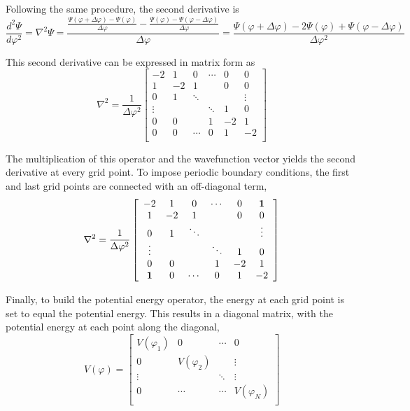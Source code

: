 \documentclass[12pt,a4paper]{article}
\begin{document}
Following the same procedure, the second derivative is
$$
\frac{d^2\Psi}{d\varphi^2} = \nabla^2\Psi = \frac{\frac{\Psi(\varphi+\Delta\varphi)-\Psi(\varphi)}{\Delta\varphi} - \frac{\Psi(\varphi)-\Psi(\varphi-\Delta\varphi)}{\Delta\varphi}}{\Delta\varphi} = \frac{\Psi(\varphi+\Delta\varphi)-2\Psi(\varphi)+\Psi(\varphi-\Delta\varphi)}{\Delta\varphi^2}
$$

This second derivative can be expressed in matrix form as
\[
    \nabla^2 = \frac{1}{\Delta\varphi^2}
    \left[ {\begin{array}{cccccc}
    -2      &  1     &  0     & \cdots &  0    &  0      \\
     1      & -2     &  1     &        &  0    &  0      \\
     0      &  1     & \ddots &        &       &  \vdots \\
     \vdots &        &        & \ddots &  1    &  0      \\
     0      &  0     &        &  1     & -2    &  1      \\
     0      &  0     & \cdots &  0     &  1    & -2      \\
    \end{array} } \right]
\]

The multiplication of this operator and the wavefunction vector yields the second derivative at every grid point.
To impose periodic boundary conditions, the first and last grid points are connected with an off-diagonal term,
\[
    \nabla^2 = \frac{1}{\Delta\varphi^2}
    \left[ {\begin{array}{cccccc}
    -2      &  1     &  0     & \cdots &  0    &  \bf{1} \\
     1      & -2     &  1     &        &  0    &  0      \\
     0      &  1     & \ddots &        &       &  \vdots \\
     \vdots &        &        & \ddots &  1    &  0      \\
     0      &  0     &        &  1     & -2    &  1      \\
     \bf{1} &  0     & \cdots &  0     &  1    & -2      \\
    \end{array} } \right]
\]

Finally, to build the potential energy operator, the energy at each grid point is set to equal the potential energy.
This results in a diagonal matrix, with the potential energy at each point along the diagonal,
\[
    V(\varphi) =
    \left[ {\begin{array}{cccc}
    V(\varphi_1) &  0            &  \cdots &  0          \\
     0           &  V(\varphi_2) &         &  \vdots     \\
     \vdots      &               &  \ddots &   \vdots     \\
     0           &   \cdots      &  \cdots & V(\varphi_N) \\
    \end{array} } \right]
\]
\end{document}
